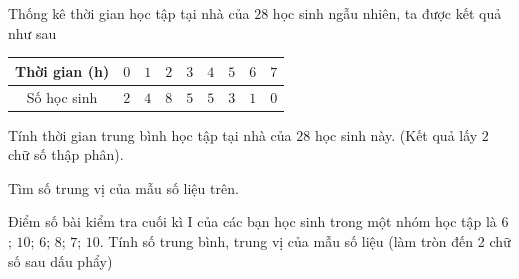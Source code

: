 \begin{bt}%
	Thống kê thời gian học tập tại nhà của $28$ học sinh ngẫu nhiên, ta được kết quả như sau
	
	\hspace{3cm}
	\begin{tabular}{|c|c|c|c|c|c|c|c|c|}
		\hline Thời gian (h) & $0$ & $1$ & $2$ & $3$ & $4$ & $5$ & $6$ & $7$\\
		\hline Số học sinh & $2$ & $4$ & $8$ & $5$ & $5$ & $3$ & $1$ & $0$\\
		\hline
	\end{tabular}
	\begin{listEX}
		\item Tính thời gian trung bình học tập tại nhà của $28$ học sinh này. (Kết quả lấy $2$ chữ số thập phân).
		\item Tìm số trung vị của mẫu số liệu trên.
	\end{listEX}
\end{bt}

\begin{bt}%
Điểm số bài kiểm tra cuối kì I của các bạn học sinh trong một nhóm học tập là $6$; $10$; $6$; $8$; $7$; $10$. Tính số trung bình, trung vị của mẫu số liệu (làm tròn đến 2 chữ số sau dấu phẩy)
\end{bt}

